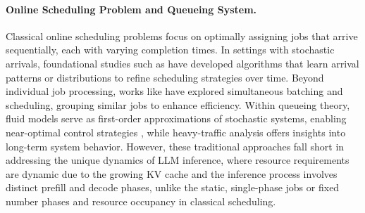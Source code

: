\paragraph*{Online Scheduling Problem and Queueing System.} 
Classical online scheduling problems focus on optimally assigning jobs that arrive sequentially, each with varying completion times. In settings with stochastic arrivals, foundational studies such as \cite{devanur2009adwords,vee2010optimal,cole2014sample,balkanski2016power,lattanzi2020online} have developed algorithms that learn arrival patterns or distributions to refine scheduling strategies over time. Beyond individual job processing, works like \cite{im2013online,lucier2013efficient,liu2015online,li2020online} have explored simultaneous batching and scheduling, grouping similar jobs to enhance efficiency. Within queueing theory, fluid models serve as first-order approximations of stochastic systems, enabling near-optimal control strategies \cite{mandelbaum1998strong,maglaras2000discrete,bauerle2002optimal,liu2011network}, while heavy-traffic analysis offers insights into long-term system behavior. However, these traditional approaches fall short in addressing the unique dynamics of LLM inference, where resource requirements are dynamic due to the growing KV cache and the inference process involves distinct prefill and decode phases, unlike the static, single-phase jobs or fixed number phases and resource occupancy in classical scheduling.


